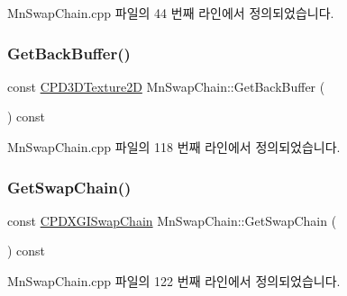Mn\+Swap\+Chain.\+cpp 파일의 44 번째 라인에서 정의되었습니다.

\mbox{\label{class_m_n_l_1_1_mn_swap_chain_a30e822e1b06f07a89dcab11412213cc6}} 
\subsubsection{\texorpdfstring{Get\+Back\+Buffer()}{GetBackBuffer()}}
{\footnotesize\ttfamily const \hyperlink{namespace_m_n_l_addb538e1cbd1f443e6db5e6312487c51}{C\+P\+D3\+D\+Texture2D} Mn\+Swap\+Chain\+::\+Get\+Back\+Buffer (\begin{DoxyParamCaption}{ }\end{DoxyParamCaption}) const}



Mn\+Swap\+Chain.\+cpp 파일의 118 번째 라인에서 정의되었습니다.

\mbox{\label{class_m_n_l_1_1_mn_swap_chain_a4f5d743bd05412d3cb7a1e7bd19c8d97}} 
\subsubsection{\texorpdfstring{Get\+Swap\+Chain()}{GetSwapChain()}}
{\footnotesize\ttfamily const \hyperlink{namespace_m_n_l_a5e8905e111c1a9d829a86fc3cc3420ec}{C\+P\+D\+X\+G\+I\+Swap\+Chain} Mn\+Swap\+Chain\+::\+Get\+Swap\+Chain (\begin{DoxyParamCaption}{ }\end{DoxyParamCaption}) const}



Mn\+Swap\+Chain.\+cpp 파일의 122 번째 라인에서 정의되었습니다.

\mbox{\label{class_m_n_l_1_1_mn_swap_chain_a169ea7905717fe2f804588101a17632d}} 
